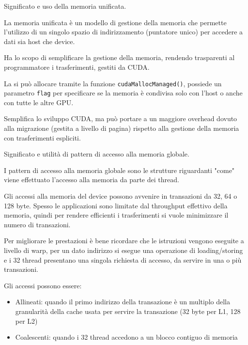 \begin{questions}
    \question Significato e uso della memoria unificata.
    
    \begin{solution}
        La memoria unificata è un modello di gestione della memoria che permette l'utilizzo di un singolo spazio di indirizzamento (puntatore unico) per accedere a dati sia host che device. 
        
        Ha lo scopo di semplificare la gestione della memoria, rendendo trasparenti al programmatore i trasferimenti, gestiti da CUDA. 
        
        La si può allocare tramite la funzione \texttt{cudaMallocManaged()}, possiede un parametro \texttt{flag} per specificare se la memoria è condivisa solo con l'host o anche con tutte le altre GPU.
        
        Semplifica lo sviluppo CUDA, ma può portare a un maggiore overhead dovuto alla migrazione (gestita a livello di pagina) rispetto alla gestione della memoria con trasferimenti espliciti.
    \end{solution}
    
    \question Significato e utilità di pattern di accesso alla memoria globale.
    
    \begin{solution}
        I pattern di accesso alla memoria globale sono le strutture riguardanti "come" viene effettuato l'accesso alla memoria da parte dei thread.
        
        Gli accessi alla memoria del device possono avvenire in transazioni da 32, 64 o 128 byte. Spesso le applicazioni sono limitate dal throughput effettivo della memoria, quindi per rendere efficienti i trasferimenti si vuole minimizzare il numero di transazioni. 
        
        Per migliorare le prestazioni è bene ricordare che le istruzioni vengono eseguite a livello di warp, per un dato indirizzo si esegue una operazione di loading/storing e i 32 thread presentano una singola richiesta di accesso, da servire in una o più transazioni.
        
        Gli accessi possono essere:
        \begin{itemize}
            \item Allineati: quando il primo indirizzo della transazione è un multiplo della granularità della cache usata per servire la transazione (32 byte per L1, 128 per L2)
            
            \item Coalescenti: quando i 32 thread accedono a un blocco contiguo di memoria
        \end{itemize}
        

\end{solution}
\end{questions}
